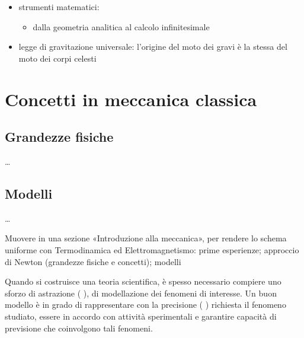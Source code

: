 \documentclass[letterpaper,10pt,italian]{jupyterBook}
\begin{document}
\begin{itemize}
\begin{itemize}
\end{itemize}

\item {} 
\sphinxAtStartPar
strumenti matematici:
\begin{itemize}
\item {} 
\sphinxAtStartPar
dalla geometria analitica al calcolo infinitesimale

\end{itemize}

\item {} 
\sphinxAtStartPar
legge di gravitazione universale: l’origine del moto dei gravi è la stessa del moto dei corpi celesti

\end{itemize}

\sphinxstepscope


\section{Concetti in meccanica classica}
\label{\detokenize{ch/mechanics/intro-vocabulary:concetti-in-meccanica-classica}}\label{\detokenize{ch/mechanics/intro-vocabulary:physics-hs-mechanics-intro-vocabulary}}\label{\detokenize{ch/mechanics/intro-vocabulary::doc}}

\subsection{Grandezze fisiche}
\label{\detokenize{ch/mechanics/intro-vocabulary:grandezze-fisiche}}
\sphinxAtStartPar
…


\subsection{Modelli}
\label{\detokenize{ch/mechanics/intro-vocabulary:modelli}}
\sphinxAtStartPar
…

\sphinxAtStartPar
Muovere in una sezione «Introduzione alla meccanica», per rendere lo schema uniforme con Termodinamica ed Elettromagnetismo: prime esperienze; approccio di Newton (grandezze fisiche e concetti); modelli

\sphinxAtStartPar
Quando si costruisce una teoria scientifica, è spesso necessario compiere uno sforzo di astrazione ( ), di modellazione dei fenomeni di interesse. Un buon modello è in grado di rappresentare con la precisione ( ) richiesta il fenomeno studiato, essere in accordo con attività sperimentali e garantire capacità di previsione che coinvolgono tali fenomeni.
\end{document}
